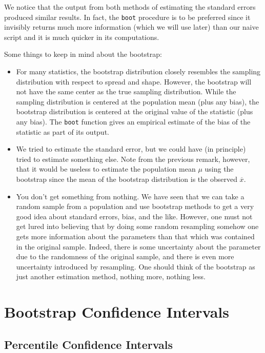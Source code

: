 \documentclass[captions=tableheading]{scrbook}
\begin{document}
We notice that the output from both methods of estimating the standard errors produced similar results. In fact, the \texttt{boot} procedure is to be preferred since it invisibly returns much more information (which we will use later) than our naive script and it is much quicker in its computations.

\begin{rem}
Some things to keep in mind about the bootstrap:

\begin{itemize}
\item For many statistics, the bootstrap distribution closely resembles the sampling distribution with respect to spread and shape. However, the bootstrap will not have the same center as the true sampling distribution. While the sampling distribution is centered at the population mean (plus any bias), the bootstrap distribution is centered at the original value of the statistic (plus any bias). The \texttt{boot} function gives an empirical estimate of the bias of the statistic as part of its output.
\item We tried to estimate the standard error, but we could have (in principle) tried to estimate something else. Note from the previous remark, however, that it would be useless to estimate the population mean \(\mu\) using the bootstrap since the mean of the bootstrap distribution is the observed \(\overline{x}\).
\item You don't get something from nothing. We have seen that we can take a random sample from a population and use bootstrap methods to get a very good idea about standard errors, bias, and the like. However, one must not get lured into believing that by doing some random resampling somehow one gets more information about the parameters than that which was contained in the original sample. Indeed, there is some uncertainty about the parameter due to the randomness of the original sample, and there is even more uncertainty introduced by resampling. One should think of the bootstrap as just another estimation method, nothing more, nothing less.
\end{itemize}

\end{rem}
\section{Bootstrap Confidence Intervals}
\label{sec-13-3}

\label{sec:Bootstrap-Confidence-Intervals}
\subsection{Percentile Confidence Intervals}
\label{sec-13-3-1}
\end{document}
